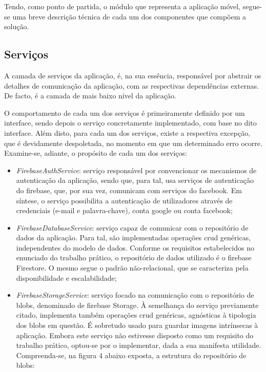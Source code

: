 \documentclass[12pt]{report}
\begin{document}
Tendo, como ponto de partida, o módulo que representa a aplicação móvel, segue-se uma breve descrição técnica de cada um dos componentes que compõem a solução.

\subsection{Serviços}

A camada de serviços da aplicação, é, na sua essência, responsável por abstrair os detalhes de comunicação da aplicação, com as respectivas dependências externas. De facto, é a camada de mais baixo nível da aplicação. 

O comportamento de cada um dos serviços é primeiramente definido por um interface, sendo depois o serviço concretamente implementado, com base no dito interface. Além disto, para cada um dos serviços, existe a respectiva excepção, que é devidamente despoletada, no momento em que um determinado erro ocorre. Examine-se, adiante, o propósito de cada um dos serviços:

\begin{itemize}
    \item \emph{FirebaseAuthService}: serviço responsável por convencionar os mecanismos de autenticação da aplicação, sendo que, para tal, usa serviços de autenticação do \gls{firebase}, que, por sua vez, comunicam com serviços do \gls{facebook}. Em síntese, o serviço possibilita a autenticação de utilizadores através de credenciais (e-mail e palavra-chave), conta \gls{google} ou conta \gls{facebook};
    
    \item \emph{FirebaseDatabaseService}: serviço capaz de comunicar com o repositório de dados da aplicação. Para tal, são implementadas operações \gls{crud} genéricas, independentes do modelo de dados. Conforme os requisitos estabelecidos no enunciado do trabalho prático, o repositório de dados utilizado é o \gls{firebase} Firestore. O mesmo segue o padrão não-relacional, que se caracteriza pela disponibilidade e escalabilidade;
    
    \item \emph{FirebaseStorageService}: serviço focado na comunicação com o repositório de \gls{blobs}, denominado de \gls{firebase} Storage. À semelhança do serviço previamente citado, implementa também operações \gls{crud} genéricas, agnósticas à tipologia dos \gls{blobs} em questão. É sobretudo usado para guardar imagens intrínsecas à aplicação. Embora este serviço não estivesse disposto como um requisito do trabalho prático, optou-se por o implementar, dada a sua manifesta utilidade. Compreenda-se, na figura 4 abaixo exposta, a estrutura do repositório de \gls{blobs}:
    
\end{itemize}
\end{document}
